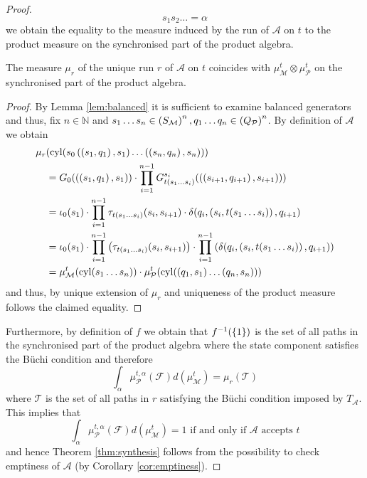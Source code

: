 \begin{proof}
\begin{equation*}
{  s_{1}s_{2}\dots = \alpha}
\end{equation*}
we obtain the equality to the measure induced by the run of $\mathcal{A}$ on
$t$ to the product measure on the synchronised part of the product algebra.
\begin{lemma}
  The measure $\mu_{r}$ of the unique run $r$ of $\mathcal{A}$ on $t$ coincides
  with $\mu_{\mathcal{M}}^{t}\otimes\mu_{\mathcal{P}}^{t}$ on the synchronised
  part of the product algebra.
  \label{lem:productmeasure}
\end{lemma}
\begin{proof}
  By Lemma \ref{lem:balanced} it is sufficient to examine balanced generators
  and thus, fix $n\in\mathbb{N}$ and $s_{1}\dots s_{n}
  \in\left(S_{\mathcal{M}}\right)^{n},
  q_{1}\dots q_{n}\in\left(Q_{\mathcal{P}}\right)^{n}$. By definition of
  $\mathcal{A}$ we obtain
  \begin{align*}
    \mu_{r}&(\operatorname{cyl}(s_{0}\left(\left(s_{1},q_{1}\right), s_{1}\right)\dots\left(\left(s_{n},q_{n}\right), s_{n}\right)))\\
    &= G_{0}(\left(\left(s_{1},q_{1}\right), s_{1}\right))\cdot\prod\limits_{i = 1}^{n-1}
    G^{s_{i}}_{t(s_{1}\dots s_{i})}(\left(\left(s_{i+1},q_{i+1}\right), s_{i+1}\right)))\\
    &=\iota_{0}(s_{1})\cdot\prod\limits_{i = 1}^{n-1}
    \tau_{t(s_{1}\dots s_{i})}(s_{i}, s_{i+1})\cdot
    \delta(q_{i}, \left(s_{i}, t(s_{1}\dots s_{i})\right), q_{i+1})\\
    &=\iota_{0}(s_{1})\cdot\prod\limits_{i = 1}^{n-1}\left(
      \tau_{t(s_{1}\dots s_{i})}(s_{i}, s_{i+1})\right)
    \cdot\prod\limits_{i = 1}^{n-1}\left(
      \delta(q_{i}, \left(s_{i}, t(s_{1}\dots s_{i})\right), q_{i+1})\right)\\
    &=\mu_{\mathcal{M}}^{t}(\operatorname{cyl}(s_{1}\dots s_{n}))\cdot
      \mu_{\mathcal{P}}^{t}(\operatorname{cyl}(\left(q_{1},s_{1}\right)\dots\left(q_{n},s_{n}\right)))
  \end{align*}
  and thus, by unique extension of $\mu_{r}$ and uniqueness of the product
  measure \cite[Theorem 5.6, Theorem 22.2]{Bauer} follows the claimed equality.
\end{proof}
Furthermore, by definition of $f$ we obtain that $f^{-1}(\left\{1\right\})$ is the set
of all paths in the synchronised part of the product algebra where the state
component satisfies the Büchi condition and therefore
\begin{equation*}
  \int_{\alpha}\mu_{\mathcal{P}}^{t,\alpha}(\mathcal{F})
  d(\mu_{\mathcal{M}}^{t}) = \mu_{r}(\mathcal{T})
\end{equation*}
where $\mathcal{T}$ is the set of all paths in $r$ satisfying the Büchi
condition imposed by $T_{\mathcal{A}}$. This implies that
\begin{equation*}
  \int_{\alpha}\mu_{\mathcal{P}}^{t,\alpha}(\mathcal{F})
  d(\mu_{\mathcal{M}}^{t}) = 1\text{ if and only if }\mathcal{A}
  \text{ accepts } t
\end{equation*}
and hence Theorem \ref{thm:synthesis} follows from the possibility to check
emptiness of $\mathcal{A}$ (by Corollary \ref{cor:emptiness}).
\end{proof}
